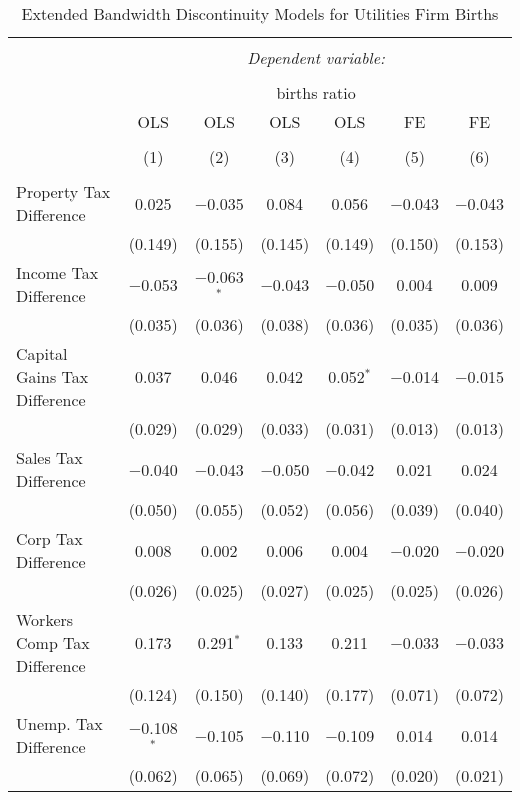 
\begin{table}[!htbp] \centering 
  \caption{Extended Bandwidth Discontinuity Models for  Utilities Firm Births} 
  \label{22eb} 
\begin{tabular}{@{\extracolsep{5pt}}lcccccc} 
\\[-1.8ex]\hline 
\hline \\[-1.8ex] 
 & \multicolumn{6}{c}{\textit{Dependent variable:}} \\ 
\cline{2-7} 
\\[-1.8ex] & \multicolumn{6}{c}{births ratio} \\ 
 & OLS & OLS & OLS & OLS & FE & FE \\ 
\\[-1.8ex] & (1) & (2) & (3) & (4) & (5) & (6)\\ 
\hline \\[-1.8ex] 
 Property Tax Difference & 0.025 & $-$0.035 & 0.084 & 0.056 & $-$0.043 & $-$0.043 \\ 
  & (0.149) & (0.155) & (0.145) & (0.149) & (0.150) & (0.153) \\ 
  Income Tax Difference & $-$0.053 & $-$0.063$^{*}$ & $-$0.043 & $-$0.050 & 0.004 & 0.009 \\ 
  & (0.035) & (0.036) & (0.038) & (0.036) & (0.035) & (0.036) \\ 
  Capital Gains Tax Difference & 0.037 & 0.046 & 0.042 & 0.052$^{*}$ & $-$0.014 & $-$0.015 \\ 
  & (0.029) & (0.029) & (0.033) & (0.031) & (0.013) & (0.013) \\ 
  Sales Tax Difference & $-$0.040 & $-$0.043 & $-$0.050 & $-$0.042 & 0.021 & 0.024 \\ 
  & (0.050) & (0.055) & (0.052) & (0.056) & (0.039) & (0.040) \\ 
  Corp Tax Difference & 0.008 & 0.002 & 0.006 & 0.004 & $-$0.020 & $-$0.020 \\ 
  & (0.026) & (0.025) & (0.027) & (0.025) & (0.025) & (0.026) \\ 
  Workers Comp Tax Difference & 0.173 & 0.291$^{*}$ & 0.133 & 0.211 & $-$0.033 & $-$0.033 \\ 
  & (0.124) & (0.150) & (0.140) & (0.177) & (0.071) & (0.072) \\ 
  Unemp. Tax Difference & $-$0.108$^{*}$ & $-$0.105 & $-$0.110 & $-$0.109 & 0.014 & 0.014 \\ 
  & (0.062) & (0.065) & (0.069) & (0.072) & (0.020) & (0.021) \\ 

\end{tabular}
\end{table}
